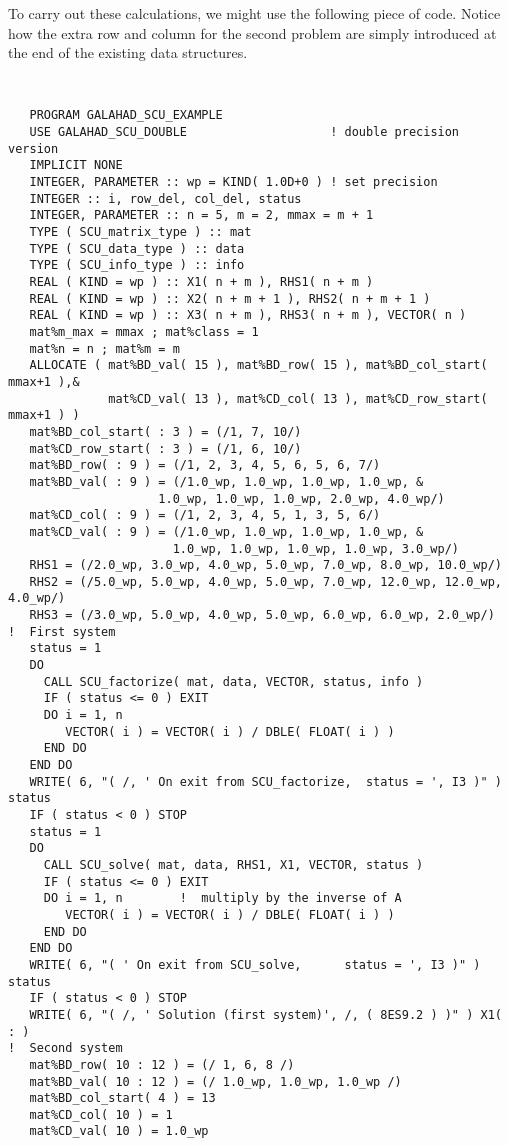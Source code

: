 \documentclass{galahad}
\begin{document}
To carry out these calculations, we might use the following piece of code.
Notice how the extra row and column for the second problem are
simply introduced at the end of the existing data structures.
{\tt
\begin{verbatim}
   PROGRAM GALAHAD_SCU_EXAMPLE
   USE GALAHAD_SCU_DOUBLE                    ! double precision version
   IMPLICIT NONE
   INTEGER, PARAMETER :: wp = KIND( 1.0D+0 ) ! set precision
   INTEGER :: i, row_del, col_del, status
   INTEGER, PARAMETER :: n = 5, m = 2, mmax = m + 1
   TYPE ( SCU_matrix_type ) :: mat
   TYPE ( SCU_data_type ) :: data
   TYPE ( SCU_info_type ) :: info
   REAL ( KIND = wp ) :: X1( n + m ), RHS1( n + m )
   REAL ( KIND = wp ) :: X2( n + m + 1 ), RHS2( n + m + 1 )
   REAL ( KIND = wp ) :: X3( n + m ), RHS3( n + m ), VECTOR( n )
   mat%m_max = mmax ; mat%class = 1
   mat%n = n ; mat%m = m
   ALLOCATE ( mat%BD_val( 15 ), mat%BD_row( 15 ), mat%BD_col_start( mmax+1 ),&
              mat%CD_val( 13 ), mat%CD_col( 13 ), mat%CD_row_start( mmax+1 ) )
   mat%BD_col_start( : 3 ) = (/1, 7, 10/)
   mat%CD_row_start( : 3 ) = (/1, 6, 10/)
   mat%BD_row( : 9 ) = (/1, 2, 3, 4, 5, 6, 5, 6, 7/)
   mat%BD_val( : 9 ) = (/1.0_wp, 1.0_wp, 1.0_wp, 1.0_wp, &
                     1.0_wp, 1.0_wp, 1.0_wp, 2.0_wp, 4.0_wp/)
   mat%CD_col( : 9 ) = (/1, 2, 3, 4, 5, 1, 3, 5, 6/)
   mat%CD_val( : 9 ) = (/1.0_wp, 1.0_wp, 1.0_wp, 1.0_wp, &
                       1.0_wp, 1.0_wp, 1.0_wp, 1.0_wp, 3.0_wp/)
   RHS1 = (/2.0_wp, 3.0_wp, 4.0_wp, 5.0_wp, 7.0_wp, 8.0_wp, 10.0_wp/)
   RHS2 = (/5.0_wp, 5.0_wp, 4.0_wp, 5.0_wp, 7.0_wp, 12.0_wp, 12.0_wp, 4.0_wp/)
   RHS3 = (/3.0_wp, 5.0_wp, 4.0_wp, 5.0_wp, 6.0_wp, 6.0_wp, 2.0_wp/)
!  First system
   status = 1
   DO
     CALL SCU_factorize( mat, data, VECTOR, status, info )
     IF ( status <= 0 ) EXIT
     DO i = 1, n
        VECTOR( i ) = VECTOR( i ) / DBLE( FLOAT( i ) )
     END DO
   END DO
   WRITE( 6, "( /, ' On exit from SCU_factorize,  status = ', I3 )" ) status
   IF ( status < 0 ) STOP
   status = 1
   DO
     CALL SCU_solve( mat, data, RHS1, X1, VECTOR, status )
     IF ( status <= 0 ) EXIT
     DO i = 1, n        !  multiply by the inverse of A
        VECTOR( i ) = VECTOR( i ) / DBLE( FLOAT( i ) )
     END DO
   END DO
   WRITE( 6, "( ' On exit from SCU_solve,      status = ', I3 )" ) status
   IF ( status < 0 ) STOP
   WRITE( 6, "( /, ' Solution (first system)', /, ( 8ES9.2 ) )" ) X1( : )
!  Second system
   mat%BD_row( 10 : 12 ) = (/ 1, 6, 8 /)
   mat%BD_val( 10 : 12 ) = (/ 1.0_wp, 1.0_wp, 1.0_wp /)
   mat%BD_col_start( 4 ) = 13
   mat%CD_col( 10 ) = 1
   mat%CD_val( 10 ) = 1.0_wp

\end{verbatim}}
\end{document}
